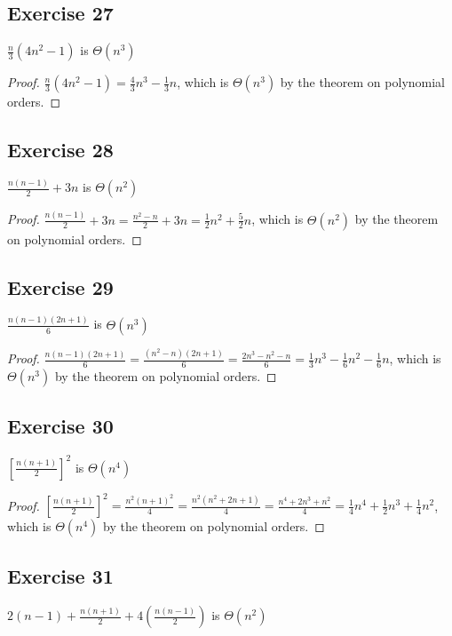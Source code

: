 \documentclass[14pt]{extarticle}
\newcommand{\dps}{\displaystyle}
\begin{document}
\subsection{Exercise 27}
\(\dps \frac{n}{3}(4n^2-1)\) is \(\Theta(n^3)\)

\begin{proof}
    \(\dps \frac{n}{3}(4n^2-1) = \frac{4}{3}n^3 - \frac{1}{3}n\), which is \(\Theta(n^3)\) by the theorem on polynomial orders.
\end{proof}

\subsection{Exercise 28}
\(\dps \frac{n(n-1)}{2}+3n\) is \(\Theta(n^2)\)

\begin{proof}
    \(\dps \frac{n(n-1)}{2}+3n = \frac{n^2-n}{2} + 3n = \frac{1}{2}n^2 + \frac{5}{2}n\), which is \(\Theta(n^2)\) by the
    theorem on polynomial orders.
\end{proof}

\subsection{Exercise 29}
\(\dps \frac{n(n-1)(2n+1)}{6}\) is \(\Theta(n^3)\)

\begin{proof}
    \(\dps \frac{n(n-1)(2n+1)}{6} = \frac{(n^2-n)(2n+1)}{6} = \frac{2n^3-n^2-n}{6} = \frac{1}{3}n^3 - \frac{1}{6}n^2 -
    \frac{1}{6}n\), which is \(\Theta(n^3)\) by the theorem on polynomial orders.
\end{proof}

\subsection{Exercise 30}
\(\dps \left[\frac{n(n+1)}{2}\right]^2\) is \(\Theta(n^4)\)

\begin{proof}
    \(\dps \left[\frac{n(n+1)}{2}\right]^2 = \frac{n^2(n+1)^2}{4} = \frac{n^2(n^2+2n+1)}{4} = \frac{n^4+2n^3+n^2}{4} =
    \frac{1}{4}n^4 + \frac{1}{2}n^3 + \frac{1}{4}n^2\), which is \(\Theta(n^4)\) by the theorem on polynomial orders.
\end{proof}

\subsection{Exercise 31}
\(\dps 2(n-1) + \frac{n(n+1)}{2} + 4\left(\frac{n(n-1)}{2}\right)\) is \(\Theta(n^2)\)
\end{document}
